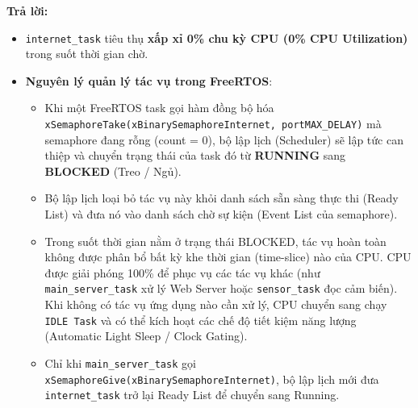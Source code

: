 \begin{tcolorbox}[colback=blue!3,colframe=blue!75!black,title=\textbf{Câu hỏi 3: internet\_task chờ với portMAX\_DELAY. Nó dùng bao nhiêu CPU trong khi chờ, và vì sao?}]
\textbf{Trả lời:}
\begin{itemize}[leftmargin=*]
    \item \texttt{internet\_task} tiêu thụ \textbf{xấp xỉ 0\% chu kỳ CPU (0\% CPU Utilization)} trong suốt thời gian chờ.
    \item \textbf{Nguyên lý quản lý tác vụ trong FreeRTOS}:
    \begin{itemize}
        \item Khi một FreeRTOS task gọi hàm đồng bộ hóa \texttt{xSemaphoreTake(xBinarySemaphoreInternet, portMAX\_DELAY)} mà semaphore đang rỗng (count = 0), bộ lập lịch (Scheduler) sẽ lập tức can thiệp và chuyển trạng thái của task đó từ \textbf{RUNNING} sang \textbf{BLOCKED} (Treo / Ngủ).
        \item Bộ lập lịch loại bỏ tác vụ này khỏi danh sách sẵn sàng thực thi (Ready List) và đưa nó vào danh sách chờ sự kiện (Event List của semaphore).
        \item Trong suốt thời gian nằm ở trạng thái BLOCKED, tác vụ hoàn toàn không được phân bổ bất kỳ khe thời gian (time-slice) nào của CPU. CPU được giải phóng 100\% để phục vụ các tác vụ khác (như \texttt{main\_server\_task} xử lý Web Server hoặc \texttt{sensor\_task} đọc cảm biến). Khi không có tác vụ ứng dụng nào cần xử lý, CPU chuyển sang chạy \texttt{IDLE Task} và có thể kích hoạt các chế độ tiết kiệm năng lượng (Automatic Light Sleep / Clock Gating).
        \item Chỉ khi \texttt{main\_server\_task} gọi \texttt{xSemaphoreGive(xBinarySemaphoreInternet)}, bộ lập lịch mới đưa \texttt{internet\_task} trở lại Ready List để chuyển sang Running.
    \end{itemize}
\end{itemize}
\end{tcolorbox}

\vspace{0.3cm}

